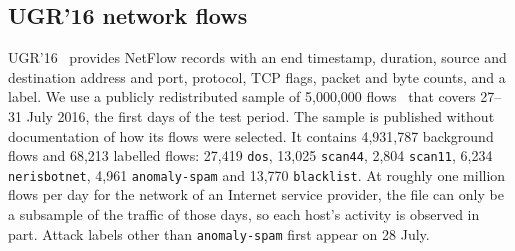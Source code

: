 \subsection{UGR'16 network flows}\label{sec:data-ugr}
UGR'16~\cite{macia2018} provides NetFlow records with an end timestamp, duration, source and destination address and port, protocol, TCP flags, packet and byte counts, and a label. We use a publicly redistributed sample of 5,000,000 flows~\cite{ugrsample} that covers 27--31 July 2016, the first days of the test period. The sample is published without documentation of how its flows were selected. It contains 4,931,787 background flows and 68,213 labelled flows: 27,419 \texttt{dos}, 13,025 \texttt{scan44}, 2,804 \texttt{scan11}, 6,234 \texttt{nerisbotnet}, 4,961 \texttt{anomaly-spam} and 13,770 \texttt{blacklist}. At roughly one million flows per day for the network of an Internet service provider, the file can only be a subsample of the traffic of those days, so each host's activity is observed in part. Attack labels other than \texttt{anomaly-spam} first appear on 28 July.
